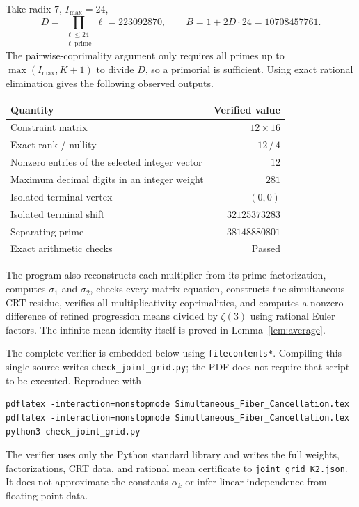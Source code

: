 Take radix $7$, $I_{\max}=24$,
\[
 D=\prod_{\substack{\ell\leq24\\\ell\ \mathrm{prime}}}\ell=223092870,
 \qquad B=1+2D\cdot24=10708457761.
\]
The pairwise-coprimality argument only requires all primes up to
$\max(I_{\max},K+1)$ to divide $D$, so a primorial is sufficient.
Using exact rational elimination gives the following observed outputs.

\begin{center}
\begin{tabular}{lr}
\toprule
Quantity & Verified value\\
\midrule
Constraint matrix & $12\times16$\\
Exact rank / nullity & $12\,/\,4$\\
Nonzero entries of the selected integer vector & $12$\\
Maximum decimal digits in an integer weight & $281$\\
Isolated terminal vertex & $(0,0)$\\
Isolated terminal shift & $32125373283$\\
Separating prime & $38148880801$\\
Exact arithmetic checks & Passed\\
\bottomrule
\end{tabular}
\end{center}

The program also reconstructs each multiplier from its prime
factorization, computes $\sigma_1$ and $\sigma_2$, checks every
matrix equation, constructs the simultaneous CRT residue, verifies
all multiplicativity coprimalities, and computes a nonzero difference
of refined progression means divided by $\zeta(3)$ using rational
Euler factors. The infinite mean identity itself is proved in
Lemma~\ref{lem:average}.

The complete verifier is embedded below using \texttt{filecontents*}.
Compiling this single source writes \texttt{check\_joint\_grid.py};
the PDF does not require that script to be executed. Reproduce with
\begin{lstlisting}
pdflatex -interaction=nonstopmode Simultaneous_Fiber_Cancellation.tex
pdflatex -interaction=nonstopmode Simultaneous_Fiber_Cancellation.tex
python3 check_joint_grid.py
\end{lstlisting}
The verifier uses only the Python standard library and writes the
full weights, factorizations, CRT data, and rational mean certificate
to \texttt{joint\_grid\_K2.json}. It does not approximate the constants
$\alpha_k$ or infer linear independence from floating-point data.

